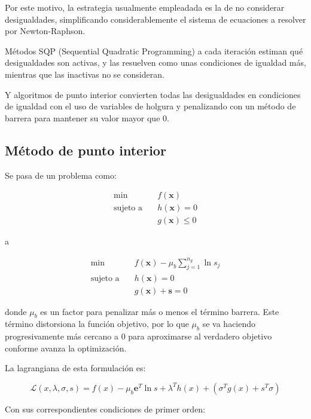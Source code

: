 Por este motivo, la estrategia usualmente empleadada es la de no considerar
desigualdades, simplificando considerablemente el sistema de ecuaciones a
resolver por Newton-Raphson.

Métodos SQP (Sequential Quadratic Programming) a cada iteración estiman qué
desigualdades son activas, y las resuelven como unas condiciones de igualdad
más, mientras que las inactivas no se consideran.

Y algoritmos de punto interior convierten todas las desigualdades en
condiciones de igualdad con el uso de variables de holgura y penalizando con un
método de barrera para mantener su valor mayor que 0.


\subsection{Método de punto interior}

Se pasa de un problema como:

\begin{align}
	\min \quad            & f(\mathbf{x})         \\
	\text{sujeto a} \quad & h(\mathbf{x}) = 0     \\
	                      & g(\mathbf{x}) \leq  0
\end{align}

a

\begin{align}
	\min \quad            & f(\mathbf{x}) - \mu_b \sum_{j=1}^{n_g} \ln s_j \\
	\text{sujeto a} \quad & h(\mathbf{x}) = 0                              \\
	                      & g(\mathbf{x}) + \mathbf{s} = 0
\end{align}

donde $\mu_b$ es un factor para penalizar más o menos el término barrera. Este
término distorsiona la función objetivo, por lo que $\mu_b$ se va haciendo
progresivamente más cercano a 0 para aproximarse al verdadero objetivo conforme
avanza la optimización.

La lagrangiana de esta formulación es:

\begin{equation}
	\mathcal{L}(x, \lambda, \sigma, s) = f(x) - \mu_b \mathbf{e}^T \ln s + \lambda^T h(x) + (\sigma^T g(x) + s^T \sigma)
\end{equation}

Con sus correspondientes condiciones de primer orden:


